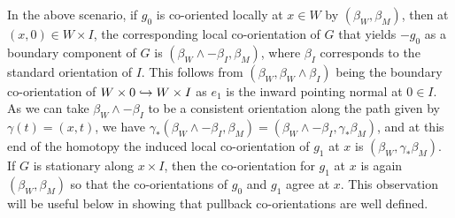 \begin{remark}\label{R: stationary homotopy}
	In the above scenario, if $g_0$ is co-oriented locally at $x \in W$ by $(\beta_W,\beta_M)$, then at $(x,0) \in W \times I$, the corresponding local co-orientation of $G$ that yields $-g_0$ as a boundary component of $G$ is $(\beta_W \wedge -\beta_I, \beta_M)$, where $\beta_I$ corresponds to the standard orientation of $I$.
	This follows from $(\beta_W,\beta_W \wedge \beta_I)$ being the boundary co-orientation of $W \times 0 \hookrightarrow W \times I$ as $e_1$ is the inward pointing normal at $0 \in I$.
	As we can take $\beta_W \wedge -\beta_I$ to be a consistent orientation along the path given by $\gamma(t) = (x,t)$, we have $\gamma_*(\beta_W \wedge -\beta_I, \beta_M) = (\beta_W \wedge -\beta_I,\gamma_*\beta_M)$, and at this end of the homotopy the induced local co-orientation of $g_1$ at $x$ is $(\beta_W,\gamma_*\beta_M)$.
	If $G$ is stationary along $x \times I$, then the co-orientation for $g_1$ at $x$ is again $(\beta_W,\beta_M)$ so that the co-orientations of $g_0$ and $g_1$ agree at $x$.
	This observation will be useful below in showing that pullback co-orientations are well defined.
\end{remark}

